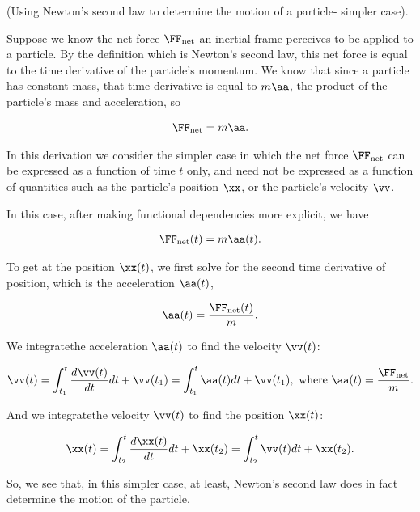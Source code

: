\documentclass{article}
\begin{document}
\begin{deriv}
    (Using Newton's second law to determine the motion of a particle- simpler case).

    Suppose we know the net force $\FF_{\text{net}}$ an inertial frame perceives to be applied to a particle. By the definition which is Newton's second law, this net force is equal to the time derivative of the particle's momentum. We know that since a particle has constant mass, that time derivative is equal to $m \aa$, the product of the particle's mass and acceleration, so
    
    \begin{align*}
        \FF_{\text{net}} = m \aa.
    \end{align*}

    In this derivation we consider the simpler case in which the net force $\FF_{\text{net}}$ can be expressed as a function of time $t$ only, and need not be expressed as a function of quantities such as the particle's position $\xx$, or the particle's velocity $\vv$.
    
    In this case, after making functional dependencies more explicit, we have
    
    \begin{align*}
        \FF_{\text{net}}(t) = m \aa(t).
    \end{align*}
    
    To get at the position $\xx(t)$, we first solve for the second time derivative of position, which is the acceleration $\aa(t)$,
    
    \begin{align*}
        \aa(t) = \frac{\FF_{\text{net}}(t)}{m}.
    \end{align*}
    
    We integrate\footnotemark the acceleration $\aa(t)$ to find the velocity $\vv(t)$:    
    
    \begin{align*}
        \vv(t) = \int_{t_1}^t \frac{d\vv(t)}{dt} dt + \vv(t_1) = \int_{t_1}^t \aa(t) dt + \vv(t_1), \text{ where $\aa(t) = \frac{\FF_{\text{net}}}{m}$}.
    \end{align*}
    
    And we integrate\footnotemark the velocity $\vv(t)$ to find the position $\xx(t)$:
    
    \begin{align*}
        \xx(t) = \int_{t_2}^t \frac{d\xx(t)}{dt} dt + \xx(t_2) = \int_{t_2}^t \vv(t) dt + \xx(t_2).
    \end{align*}

    So, we see that, in this simpler case, at least, Newton's second law does in fact determine the motion of the particle.
\end{deriv}
\end{document}
